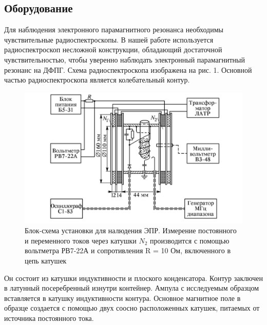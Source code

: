 \documentclass[14pt, a4paper]{extarticle}
\begin{document}
\subsection{Оборудование} %
\label{sec:оборудование}
Для наблюдения электронного парамагнитного резонанса необходимы чувствительные радиоспектроскопы. В нашей работе используется радиоспектроскоп несложной конструкции, обладающий достаточной чувствительностью, чтобы уверенно наблюдать электронный парамагнитный резонанс на ДФПГ. 
Схема радиоспектроскопа изображена на рис. 1. Основной частью радиоспектроскопа является колебательный контур.
\begin{figure}[h!]
	\centering
	\includegraphics[width = 0.4\paperwidth]{laba_10_1_scheme}
	\caption{Блок-схема установки для налюдения ЭПР. Измерение постоянного и переменного токов через катушки $N_2$ производится с помощью вольтметра РВ7-22А и сопротивления R = 10 Ом, включенного в цепь катушек}
\end{figure}
Он состоит из катушки индуктивности и плоского конденсатора. Контур заключен в латунный посеребренный изнутри контейнер. Ампула с исследуемым образцом вставляется в катушку индуктивности контура. Основное магнитное поле в образце создается с помощью двух соосно расположенных катушек, питаемых от источника постоянного тока. 
\clearpage
\end{document}
